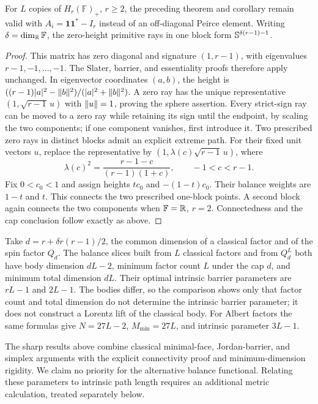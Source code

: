 \begin{corollary}\label{cor:balance-alternate}
For $L$ copies of $H_r(\mathbb F)_+$, $r\geq2$, the preceding
theorem and corollary remain valid with
$A_i=\mathbf1\mathbf1^*-I_r$ instead of an off-diagonal Peirce element.
Writing $\delta=\dim_\mathbb R\mathbb F$, the zero-height primitive rays in
one block form $\mathbb S^{\delta(r-1)-1}$.
\end{corollary}
\begin{proof}
This matrix has zero diagonal and signature $(1,r-1)$, with eigenvalues
$r-1,-1,\ldots,-1$.  The Slater, barrier, and essentiality proofs
therefore apply unchanged.  In eigenvector coordinates $(a,b)$,
the height is $((r-1)|a|^2-\lVert b\rVert^2)/(|a|^2+\lVert b\rVert^2)$.
A zero ray has the unique representative
$(1,\sqrt{r-1}\,u)$ with $\lVert u\rVert=1$, proving the sphere assertion.
Every strict-sign ray can be moved to a zero ray while retaining
its sign until the endpoint, by scaling the two components; if one
component vanishes, first introduce it.  Two prescribed zero rays in
distinct blocks admit an explicit extreme path.  For their fixed
unit vectors $u$, replace the representative by
$(1,\lambda(c)\sqrt{r-1}\,u)$, where
\[
 \lambda(c)^2=\frac{r-1-c}{(r-1)(1+c)},\qquad -1<c<r-1.
\]
Fix $0<c_0<1$ and assign heights $tc_0$ and $-(1-t)c_0$.
Their balance weights are $1-t$ and $t$.  This connects the two
prescribed one-block points.  A second block again connects the
two components when $\mathbb F=\mathbb R$, $r=2$.
Connectedness and the cap conclusion follow exactly as above.
\end{proof}

Take $d=r+\delta r(r-1)/2$, the common dimension of a classical factor
and of the spin factor $Q_d$.  The balance slices built from $L$
classical factors and from $Q_d^L$ both have body dimension $dL-2$,
minimum factor count $L$ under the cap $d$, and minimum total dimension
$dL$.  Their optimal intrinsic barrier parameters are $rL-1$ and
$2L-1$.  The bodies differ, so the comparison shows only that factor
count and total dimension do not determine the intrinsic barrier
parameter; it does not construct a Lorentz lift of the classical body.
For Albert factors the same formulas give $N=27L-2$, $M_{\min}=27L$,
and intrinsic parameter $3L-1$.

The sharp results above combine classical minimal-face, Jordan-barrier,
and simplex arguments with the explicit connectivity proof and
minimum-dimension rigidity.  We claim no priority for the alternative
balance functional.  Relating these parameters to intrinsic path length
requires an additional metric calculation, treated separately below.

